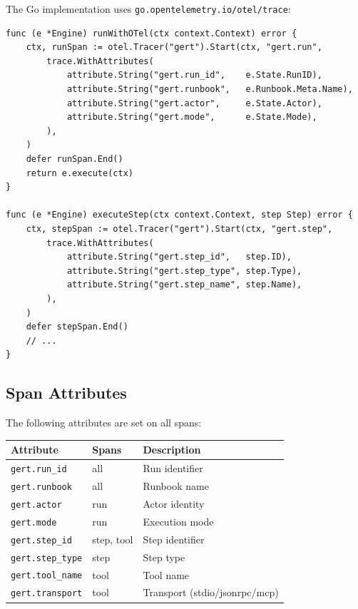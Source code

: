 The Go implementation uses \texttt{go.opentelemetry.io/otel/trace}:

\begin{verbatim}
func (e *Engine) runWithOTel(ctx context.Context) error {
    ctx, runSpan := otel.Tracer("gert").Start(ctx, "gert.run",
        trace.WithAttributes(
            attribute.String("gert.run_id",    e.State.RunID),
            attribute.String("gert.runbook",   e.Runbook.Meta.Name),
            attribute.String("gert.actor",     e.State.Actor),
            attribute.String("gert.mode",      e.State.Mode),
        ),
    )
    defer runSpan.End()
    return e.execute(ctx)
}

func (e *Engine) executeStep(ctx context.Context, step Step) error {
    ctx, stepSpan := otel.Tracer("gert").Start(ctx, "gert.step",
        trace.WithAttributes(
            attribute.String("gert.step_id",   step.ID),
            attribute.String("gert.step_type", step.Type),
            attribute.String("gert.step_name", step.Name),
        ),
    )
    defer stepSpan.End()
    // ...
}
\end{verbatim}

\subsection{Span Attributes}

The following attributes are set on all spans:

\begin{center}
\begin{tabular}{lll}
\hline
\textbf{Attribute} & \textbf{Spans} & \textbf{Description} \\
\hline
\texttt{gert.run\_id}     & all       & Run identifier \\
\texttt{gert.runbook}     & all       & Runbook name \\
\texttt{gert.actor}       & run       & Actor identity \\
\texttt{gert.mode}        & run       & Execution mode \\
\texttt{gert.step\_id}    & step, tool & Step identifier \\
\texttt{gert.step\_type}  & step      & Step type \\
\texttt{gert.tool\_name}  & tool      & Tool name \\
\texttt{gert.transport}   & tool      & Transport (stdio/jsonrpc/mcp) \\
\hline
\end{tabular}
\end{center}


